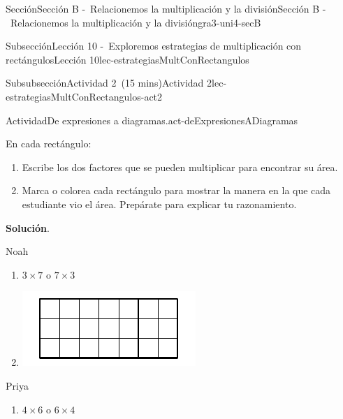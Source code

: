 \documentclass[oneside,10pt,]{article}
\newcommand{\blocktitlefont}{\relax}
\begin{document}
\begin{sectionptx}{Sección}{Sección B -~Relacionemos la multiplicación y la división}{}{Sección B -~Relacionemos la multiplicación y la división}{}{}{gra3-uni4-secB}
\begin{subsectionptx}{Subsección}{Lección 10 -~Exploremos estrategias de multiplicación con rectángulos}{}{Lección 10}{}{}{lec-estrategiasMultConRectangulos}
\begin{subsubsectionptx}{Subsubsección}{Actividad 2~(15 mins)}{}{Actividad 2}{}{}{lec-estrategiasMultConRectangulos-act2}
\begin{activity}{Actividad}{De expresiones a diagramas.}{act-deExpresionesADiagramas}
\par
En cada rectángulo:%
%
\begin{enumerate}
\item{}Escribe los dos factores que se pueden multiplicar para encontrar su área.%
\item{}Marca o colorea cada rectángulo para mostrar la manera en la que cada estudiante vio el área. Prepárate para explicar tu razonamiento.%
\end{enumerate}
\par\smallskip%
\noindent\textbf{\blocktitlefont Solución}.\hypertarget{act-deExpresionesADiagramas-3}{}\quad{}\begin{sidebyside}{3}{0.0166666666666667}{0.0166666666666667}{0.0333333333333333}%
\begin{sbspanel}{0.3}%
Noah%
%
\begin{enumerate}
\item{}\(3\times 7\) o \(7\times 3\)%
\item{}\includegraphics[width=\linewidth]{external/svg-source/tikz-file-153052.pdf}
%
\end{enumerate}
\end{sbspanel}%
\begin{sbspanel}{0.3}%
Priya%
%
\begin{enumerate}
\item{}\(4\times 6\) o \(6\times 4\)%

\end{enumerate}
\end{sbspanel}
\end{sidebyside}
\end{activity}
\end{subsubsectionptx}
\end{subsectionptx}
\end{sectionptx}
\end{document}

